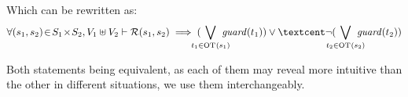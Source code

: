 \documentclass[runningheads]{llncs}
\begin{document}
Which can be rewritten as:
\[
\forall \mpar{s_1, s_2} \!\in\! S_1 \!\times\! S_2, V_1 \uplus V_2  \vdash \mathcal{R}\mpar{s_1, s_2} \implies( \bigvee_\subbox{t_1 \in \fOT{s_1}} \fguard{t_1} ) \lor¢ \lnot( \bigvee_\subbox{t_2 \in \fOT{s_2}} \fguard{t_2}  )
\]

Both statements being equivalent, as each of them may reveal more intuitive than the other in different situations, we  use them interchangeably.
%
%
\end{document}
